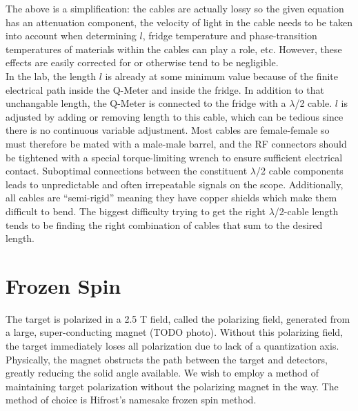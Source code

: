 The above is a simplification: the cables are actually lossy so the given equation has an attenuation component, the velocity of light in the cable needs to be taken into account when determining $l$, fridge temperature and phase-transition temperatures of materials within the cables can play a role, etc.  However, these effects are easily corrected for or otherwise tend to be negligible.\\

In the lab, the length $l$ is already at some minimum value because of the finite electrical path inside the Q-Meter and inside the fridge.  In addition to that unchangable length, the Q-Meter is connected to the fridge with a $\lambda$/2 cable. $l$ is adjusted by adding or removing length to this cable, which can be tedious since there is no continuous variable adjustment.  Most cables are female-female so must therefore be mated with a male-male barrel, and the RF connectors should be tightened with a special torque-limiting wrench to ensure sufficient electrical contact. Suboptimal connections between the constituent $\lambda$/2 cable components leads to unpredictable and often irrepeatable signals on the scope.  Additionally, all cables are ``semi-rigid'' meaning they have copper shields which make them difficult to bend. The biggest difficulty trying to get the right $\lambda$/2-cable length tends to be finding the right combination of cables that sum to the desired length.\\




\section{Frozen Spin} 
 
 The target is polarized in a 2.5 T field, called the polarizing field, generated from a large, super-conducting magnet (TODO photo).  Without this polarizing field, the target immediately loses all polarization due to lack of a quantization axis.  Physically, the magnet obstructs the path between the target and detectors, greatly reducing the solid angle available. We wish to employ a method of maintaining target polarization without the polarizing magnet in the way.  The method of choice is Hifrost's namesake frozen spin method.
 
